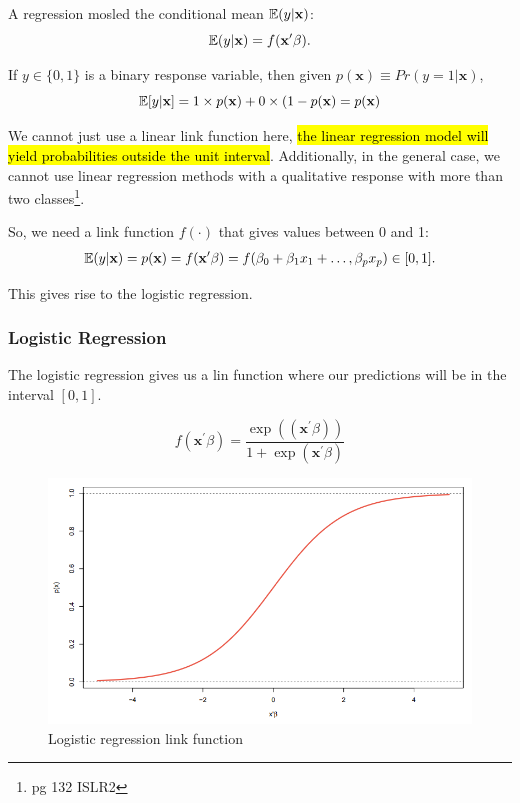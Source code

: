 \documentclass[11pt]{article}
\begin{document}
A regression mosled the conditional mean $\mathbb{E}(y|\mathbf{x})$:
\begin{equation*}
    \mathbb{E}(y|\mathbf{x}) = f(\mathbf{x^\prime}\beta).
\end{equation*}

If $y \in \{0,1\}$ is a binary response variable, then given $p(\mathbf{x}) \equiv Pr(y = 1|\mathbf{x})$,
\begin{equation*}
    \mathbb{E}[y|\mathbf{x}] = 1 \times p(\mathbf{x}) + 0 \times (1-p(\mathbf{x}) = p(\mathbf{x})
\end{equation*}

We cannot just use a linear link function here, \hl{the linear regression model will yield probabilities outside the unit interval}. Additionally, in the general case, we cannot use linear regression methods with a qualitative response with more than two classes\footnote{pg 132 ISLR2}.

So, we need a link function $f(\cdot)$ that gives values between 0 and 1:
\begin{equation*}
    \mathbb{E}(y|\mathbf{x}) = p(\mathbf{x}) = f(\mathbf{x^\prime}\beta) = f(\beta_0 + \beta_1 x_1 + \ldots, \beta_p x_p) \in [0,1].
\end{equation*}

This gives rise to the logistic regression.

\subsubsection{Logistic Regression}

The logistic regression gives us a lin function where our predictions will be in the interval $[0,1]$.

\begin{equation}
    \label{eq:logistic link}
    f(\mathbf{x^\prime}\beta) = \dfrac{\exp((\mathbf{x^\prime}\beta))}{1 + \exp (\mathbf{x^\prime}\beta)}
\end{equation}

\begin{figure}[h]
    \centering
    \includegraphics[width=.25\linewidth]{pic/logistic.png}
    \caption{Logistic regression link function}
    \label{fig:enter-label}
\end{figure}
\end{document}
